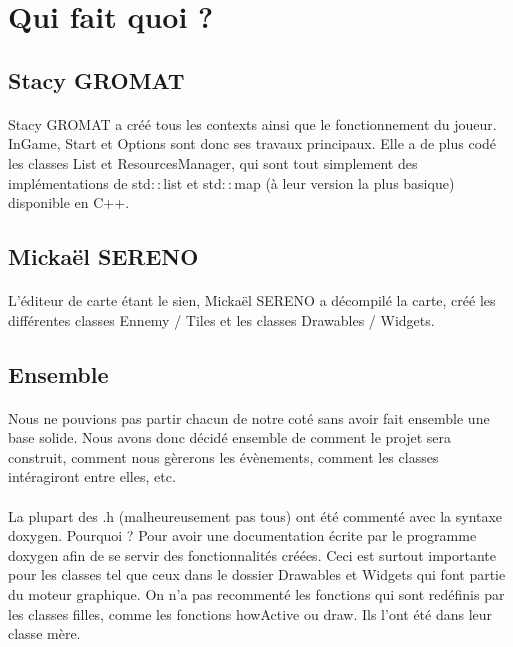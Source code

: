 ﻿\section{Qui fait quoi ?}

\subsection{Stacy GROMAT}
\paragraph{} Stacy GROMAT a créé tous les contexts ainsi que le fonctionnement du joueur. InGame, Start et Options sont donc ses travaux principaux. Elle a de plus codé les classes List et ResourcesManager, qui sont tout simplement des implémentations de std$::$list et std$::$map (à leur version la plus basique) disponible en C++. 

\subsection{Mickaël SERENO}
\paragraph{} L'éditeur de carte étant le sien, Mickaël SERENO a décompilé la carte, créé les différentes classes Ennemy / Tiles et les classes Drawables / Widgets.

\subsection{Ensemble}
\paragraph{} Nous ne pouvions pas partir chacun de notre coté sans avoir fait ensemble une base solide. Nous avons donc décidé ensemble de comment le projet sera construit, comment nous gèrerons les évènements, comment les classes intéragiront entre elles, etc.
\paragraph{} La plupart des .h (malheureusement pas tous) ont été commenté avec la syntaxe doxygen. Pourquoi ? Pour avoir une documentation écrite par le programme doxygen afin de se servir des fonctionnalités créées. Ceci est surtout importante pour les classes tel que ceux dans le dossier Drawables et Widgets qui font partie du moteur graphique. On n'a pas recommenté les fonctions qui sont redéfinis par les classes filles, comme les fonctions howActive ou draw. Ils l'ont été dans leur classe mère.

